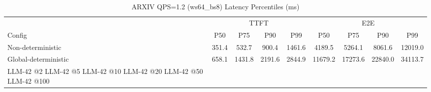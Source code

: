 \begin{table}[htbp]
\centering
\caption{ARXIV QPS=1.2 (ws64_bs8) Latency Percentiles (ms)}
\label{tab:arxiv_qps1.2_ws64_bs8}
\begin{tabular}{l|cccc|cccc}
\toprule
& \multicolumn{4}{c|}{TTFT} & \multicolumn{4}{c}{E2E} \\
Config & P50 & P75 & P90 & P99 & P50 & P75 & P90 & P99 \\
\midrule
Non-deterministic & 351.4 & 532.7 & 900.4 & 1461.6 & 4189.5 & 5264.1 & 8061.6 & 12019.0 \\
Global-deterministic & 658.1 & 1431.8 & 2191.6 & 2844.9 & 11679.2 & 17273.6 & 22840.0 & 34113.7 \\
LLM-42 @2%
LLM-42 @5%
LLM-42 @10%
LLM-42 @20%
LLM-42 @50%
LLM-42 @100%
\bottomrule
\end{tabular}
\end{table}

